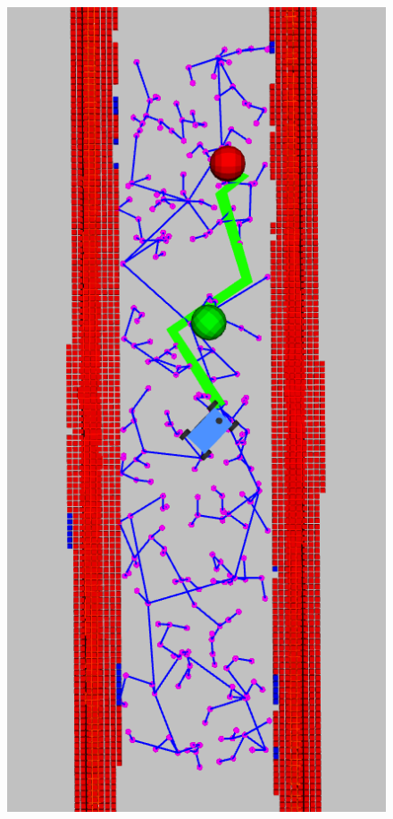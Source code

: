 \documentclass[letta4 paper]{article}
\numberwithin{equation}{section}
\newcommand{\0}{\mathbf{0}}
\begin{document}
	\begin{figure}[!hb]
		\begin{center}
			\includegraphics[scale=0.35]{rrt.png}

\end{center}
\end{figure}
\end{document}
